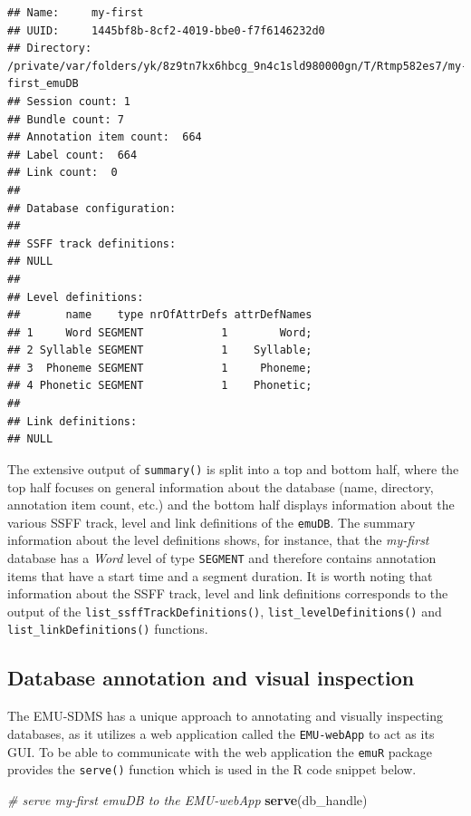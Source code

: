 \documentclass[]{book}
\newenvironment{Shaded}{\begin{snugshade}}{\end{snugshade}}
\newcommand{\CommentTok}[1]{\textcolor[rgb]{0.56,0.35,0.01}{\textit{#1}}}
\newcommand{\KeywordTok}[1]{\textcolor[rgb]{0.13,0.29,0.53}{\textbf{#1}}}
\newcommand{\NormalTok}[1]{#1}
\begin{document}
\begin{verbatim}
## Name:     my-first 
## UUID:     1445bf8b-8cf2-4019-bbe0-f7f6146232d0 
## Directory:    /private/var/folders/yk/8z9tn7kx6hbcg_9n4c1sld980000gn/T/Rtmp582es7/my-first_emuDB 
## Session count: 1 
## Bundle count: 7 
## Annotation item count:  664 
## Label count:  664 
## Link count:  0 
## 
## Database configuration:
## 
## SSFF track definitions:
## NULL
## 
## Level definitions:
##       name    type nrOfAttrDefs attrDefNames
## 1     Word SEGMENT            1        Word;
## 2 Syllable SEGMENT            1    Syllable;
## 3  Phoneme SEGMENT            1     Phoneme;
## 4 Phonetic SEGMENT            1    Phonetic;
## 
## Link definitions:
## NULL
\end{verbatim}

The extensive output of \texttt{summary()} is split into a top and bottom half, where the top half focuses on general information about the database (name, directory, annotation item count, etc.) and the bottom half displays information about the various SSFF track, level and link definitions of the \texttt{emuDB}. The summary information about the level definitions shows, for instance, that the \emph{my-first} database has a \emph{Word} level of type \texttt{SEGMENT} and therefore contains annotation items that have a start time and a segment duration. It is worth noting that information about the SSFF track, level and link definitions corresponds to the output of the \texttt{list\_ssffTrackDefinitions()}, \texttt{list\_levelDefinitions()} and \texttt{list\_linkDefinitions()} functions.

\hypertarget{database-annotation-and-visual-inspection}{%
\subsection{Database annotation and visual inspection}\label{database-annotation-and-visual-inspection}}

The EMU-SDMS has a unique approach to annotating and visually inspecting databases, as it utilizes a web application called the \texttt{EMU-webApp} to act as its GUI. To be able to communicate with the web application the \texttt{emuR} package provides the \texttt{serve()} function which is used in the R code snippet below.

\begin{Shaded}
\begin{Highlighting}[]
\CommentTok{# serve my-first emuDB to the EMU-webApp}
\KeywordTok{serve}\NormalTok{(db_handle)}
\end{Highlighting}
\end{Shaded}
\end{document}
